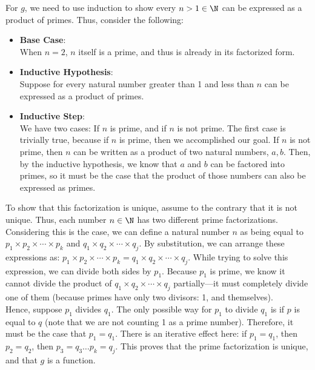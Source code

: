 {                \noindent For $g$, we need to use induction to show every $n > 1 \in \N$ can be expressed as a product of primes. Thus, consider the following: 
                \begin{itemize}
                    \item \textbf{Base Case}: \\
                    When $n = 2$, $n$ itself is a prime, and thus is already in its factorized form. 
                    \item \textbf{Inductive Hypothesis}: \\
                    Suppose for every natural number greater than 1 and less than $n$ can be expressed as a product of primes. 
                    \item \textbf{Inductive Step}: \\
                    We have two cases: If $n$ is prime, and if $n$ is not prime. The first case is trivially true, because if $n$ is prime, then we accomplished our goal. If $n$ is not prime, then $n$ can be written as a product of two natural numbers, $a,b$. Then, by the inductive hypothesis, we know that $a$ and $b$ can be factored into primes, so it must be the case that the product of those numbers can also be expressed as primes.
                \end{itemize}
                To show that this factorization is unique, assume to the contrary that it is not unique. Thus, each number $n \in \N$ has two different prime factorizations. Considering this is the case, we can define a natural number $n$ as being equal to $p_1 \times p_2 \times \cdots \times p_k$ and $q_1 \times q_2 \times \cdots \times q_j$. By substitution, we can arrange these expressions as: $p_1 \times p_2 \times \cdots \times p_k = q_1 \times q_2 \times \cdots \times q_j$. While trying to solve this expression, we can divide both sides by $p_1$. Because $p_1$ is prime, we know it cannot divide the product of $q_1 \times q_2 \times \cdots \times q_j$ partially---it must completely divide one of them (because primes have only two divisors: 1, and themselves). \\

                \noindent Hence, suppose $p_1$ divides $q_1$. The only possible way for $p_1$ to divide $q_1$ is if $p$ is equal to $q$ (note that we are not counting 1 as a prime number). Therefore, it must be the case that $p_1 = q_1$. There is an iterative effect here: if $p_1 = q_1$, then $p_2 = q_2$, then $p_3 = q_3 \dots p_k = q_j$. This proves that the prime factorization is unique, and that $g$ is a function. \\

}
